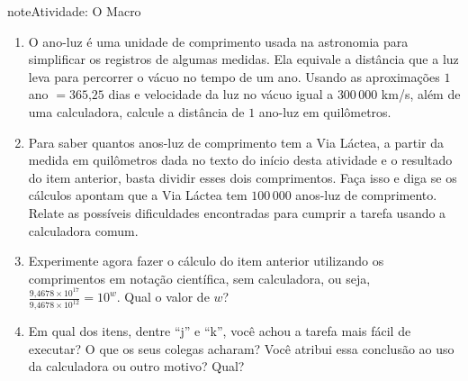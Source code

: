 \begin{sphinxadmonition}{note}{Atividade: O Macro}
\begin{enumerate}
\item {} 
O ano-luz é uma unidade de comprimento usada na astronomia para simplificar os registros de algumas medidas. Ela equivale a distância que a luz leva para percorrer o vácuo no tempo de um ano. Usando as aproximações \(1\) ano \(= 365\text{,}25\) dias e velocidade da luz no vácuo igual a \(300\, 000\) km/s, além de uma calculadora, calcule a distância de \(1\) ano-luz em quilômetros.

\item {} 
Para saber quantos anos-luz de comprimento tem a Via Láctea, a partir da medida em quilômetros dada no texto do início desta atividade e o resultado do item anterior, basta dividir esses dois comprimentos. Faça isso e diga se os cálculos apontam que a Via Láctea tem \(100\,000\) anos-luz de comprimento. Relate as possíveis dificuldades encontradas para cumprir a tarefa usando a calculadora comum.

\item {} 
Experimente agora fazer o cálculo do item anterior utilizando os comprimentos em notação científica, sem calculadora, ou seja, \(\frac{9\text{,}4678 \times 10^{17}}{9\text{,}4678 \times 10^{12}}=10^w\). Qual o valor de \(w\)?

\item {} 
Em qual dos itens, dentre “j” e “k”, você achou a tarefa mais fácil de executar? O que os seus colegas acharam? Você atribui essa conclusão ao uso da calculadora ou outro motivo? Qual?

\end{enumerate}
\end{sphinxadmonition}

